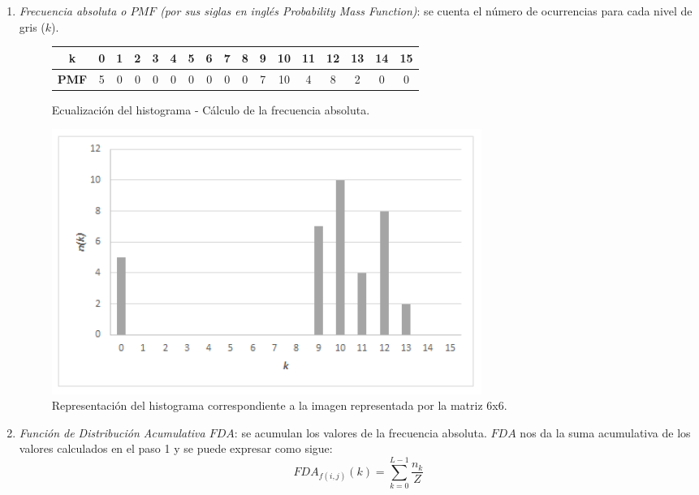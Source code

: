 \begin{enumerate}
  \item \textit{Frecuencia absoluta o $PMF$ (por sus siglas en inglés Probability Mass Function)}: se cuenta el número de ocurrencias para cada nivel de gris ($k$).
  
    \begin{figure}[H]
    \centering
        \begin{tabular} {| c | c | c | c | c | c | c | c | c |c | c | c | c | c | c | c | c |} \hline
                \textbf{k} & 0 & 1 & 2 & 3 & 4 & 5 & 6 & 7 & 8 & 9 & 10 & 11 & 12 & 13 & 14 & 15 \\ \hline
                \textbf{PMF} & 5 & 0 & 0 & 0 & 0 & 0 & 0 & 0 & 0 & 7 & 10 & 4 & 8 & 2 & 0 & 0 \\ \hline
        \end{tabular}
        \caption{Ecualización del histograma - Cálculo de la frecuencia absoluta.}
        \label{tabla_frecuencia_absoluta}
    \end{figure}
    
    \begin{figure}[H]
    \centering
        \includegraphics[width=14cm] {histograma_matriz_6x6.png}
        \caption{Representación del histograma correspondiente a la imagen representada por la matriz 6x6.}
        \label{representacion_histograma_6x6}
    \end{figure}

 \item \textit{Función de Distribución Acumulativa $FDA$}: se acumulan los valores de la frecuencia absoluta. $FDA$ nos da la suma acumulativa de los valores calculados en el paso 1 y se puede expresar como sigue:
    \begin{equation} \label{fda}
        FDA_{f(i,j)}(k)=\sum_{k=0}^{L-1} \frac{n_k}{Z}
    \end{equation}
    

\end{enumerate}
